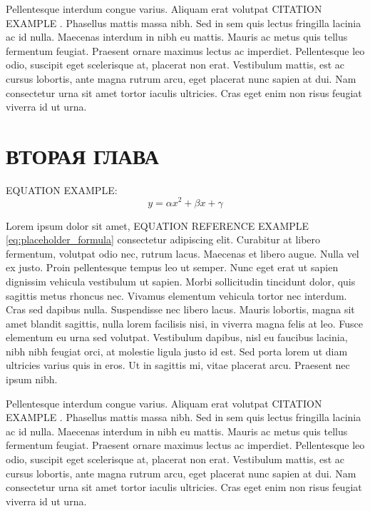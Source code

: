 Pellentesque interdum congue varius. Aliquam erat volutpat CITATION EXAMPLE \cite{smirnov2025latex}. Phasellus mattis massa nibh. Sed in sem quis lectus fringilla lacinia ac id nulla. Maecenas interdum in nibh eu mattis. Mauris ac metus quis tellus fermentum feugiat. Praesent ornare maximus lectus ac imperdiet. Pellentesque leo odio, suscipit eget scelerisque at, placerat non erat. Vestibulum mattis, est ac cursus lobortis, ante magna rutrum arcu, eget placerat nunc sapien at dui. Nam consectetur urna sit amet tortor iaculis ultricies. Cras eget enim non risus feugiat viverra id ut urna. 

\chapter{ВТОРАЯ ГЛАВА}

EQUATION EXAMPLE:
\begin{equation}
    y = \alpha x^2 + \beta x + \gamma
    \label{eq:placeholder_formula}
\end{equation}

Lorem ipsum dolor sit amet, EQUATION REFERENCE EXAMPLE \eqref{eq:placeholder_formula} consectetur adipiscing elit. Curabitur at libero fermentum, volutpat odio nec, rutrum lacus. Maecenas et libero augue. Nulla vel ex justo. Proin pellentesque tempus leo ut semper. Nunc eget erat ut sapien dignissim vehicula vestibulum ut sapien. Morbi sollicitudin tincidunt dolor, quis sagittis metus rhoncus nec. Vivamus elementum vehicula tortor nec interdum. Cras sed dapibus nulla. Suspendisse nec libero lacus. Mauris lobortis, magna sit amet blandit sagittis, nulla lorem facilisis nisi, in viverra magna felis at leo. Fusce elementum eu urna sed volutpat. Vestibulum dapibus, nisl eu faucibus lacinia, nibh nibh feugiat orci, at molestie ligula justo id est. Sed porta lorem ut diam ultricies varius quis in eros. Ut in sagittis mi, vitae placerat arcu. Praesent nec ipsum nibh.

Pellentesque interdum congue varius. Aliquam erat volutpat CITATION EXAMPLE \cite{volkova2026bib}. Phasellus mattis massa nibh. Sed in sem quis lectus fringilla lacinia ac id nulla. Maecenas interdum in nibh eu mattis. Mauris ac metus quis tellus fermentum feugiat. Praesent ornare maximus lectus ac imperdiet. Pellentesque leo odio, suscipit eget scelerisque at, placerat non erat. Vestibulum mattis, est ac cursus lobortis, ante magna rutrum arcu, eget placerat nunc sapien at dui. Nam consectetur urna sit amet tortor iaculis ultricies. Cras eget enim non risus feugiat viverra id ut urna.
